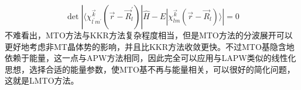 

\begin{equation}
  \det|\langle\chi_{l^{\prime}m^{\prime}}^{\vec k}(\vec r-\vec R_l^{\prime})|\hat H-E|\chi_{lm}^{\vec k}(\vec r-\vec R_l)\rangle|=0
  \label{eq:solid-147}
\end{equation}
不难看出，MTO方法与KKR方法复杂程度相当，但是MTO方法的分波展开可以更好地考虑非MT晶体势的影响，并且比KKR方法收敛更快。不过MTO基隐含地依赖于能量，这一点与APW方法相同，因此完全可以应用与LAPW类似的线性化思想，选择合适的能量参数，使MTO基不再与能量相关，可以很好的简化问题\cite{PRB12-3060_1975}，这就是LMTO方法。

